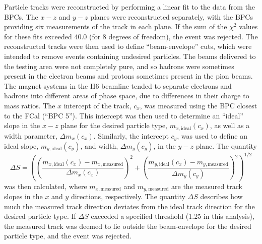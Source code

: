 Particle tracks were reconstructed by performing a linear fit to the data from the BPCs. The $x-z$ and $y-z$ planes were reconstructed separately, with the BPCs providing six measurements of the track in each plane. If the sum of the $\chi^2$ values for these fits exceeded 40.0 (for 8 degrees of freedom), the event was rejected. The reconstructed tracks were then used to define ``beam-envelope'' cuts, which were intended to remove events containing undesired particles. The beams delivered to the testing area were not completely pure, and so hadrons were sometimes present in the electron beams and protons sometimes present in the pion beams. The magnet systems in the H6 beamline tended to separate electrons and hadrons into different areas of phase space, due to differences in their charge to mass ratios. The $x$ intercept of the track, $c_x$, was measured using the BPC closest to the FCal (``BPC 5''). This intercept was then used to determine an ``ideal'' slope in the $x-z$ plane for the desired particle type, $m_{x,\mathrm{ideal}}(c_x)$, as well as a width parameter, $\Delta m_x (c_x)$. Similarly, the intercept $c_y$, was used to define an ideal slope, $m_{y,\mathrm{ideal}}(c_y)$, and width, $\Delta m_y (c_y)$, in the $y-z$ plane.
%
% 
The quantity 
\begin{equation}
\Delta S = \left(\left( \frac{ m_{x,\mathrm{ideal}}(c_x) - m_{x,\mathrm{measured}} }{ \Delta m_x (c_x)} \right)^2 + \left( \frac{ m_{y,\mathrm{ideal}}(c_x) - m_{y,\mathrm{measured}} }{ \Delta m_y (c_y)} \right)^2 \right)^{1/2}
\end{equation}
was then calculated, where $m_{x,\mathrm{measured}}$ and $m_{y,\mathrm{measured}}$ are the measured track slopes in the $x$ and $y$ directions, respectively. The quantity $\Delta S$ describes how much the measured track direction deviates from the ideal track direction for the desired particle type. If $\Delta S$ exceeded a specified threshold (1.25 in this analysis), the measured track was deemed to lie outside the beam-envelope for the desired particle type, and the event was rejected. 

